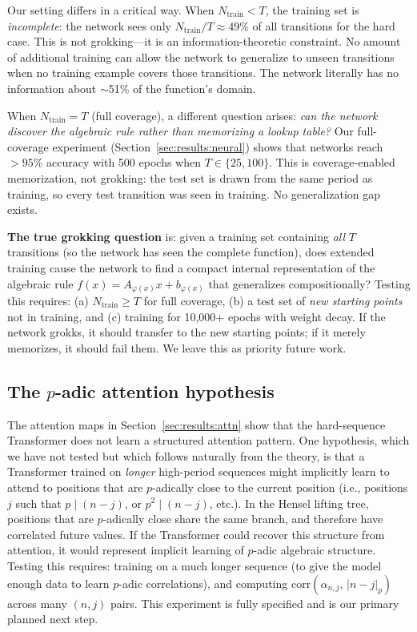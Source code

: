 \documentclass[11pt]{article}
\theoremstyle{plain}
\theoremstyle{definition}
\newcommand{\absp}[1]{\lvert #1 \rvert_p}
\begin{document}
Our setting differs in a critical way. When $N_{\mathrm{train}} < T$, the training set is \emph{incomplete}: the network sees only $N_{\mathrm{train}}/T \approx 49\%$ of all transitions for the hard case. This is not grokking---it is an information-theoretic constraint. No amount of additional training can allow the network to generalize to unseen transitions when no training example covers those transitions. The network literally has no information about $\sim$51\% of the function's domain.

When $N_{\mathrm{train}} = T$ (full coverage), a different question arises: \emph{can the network discover the algebraic rule rather than memorizing a lookup table?} Our full-coverage experiment (Section~\ref{sec:results:neural}) shows that networks reach $>95\%$ accuracy with 500 epochs when $T \in \{25, 100\}$. This is coverage-enabled memorization, not grokking: the test set is drawn from the same period as training, so every test transition was seen in training. No generalization gap exists.

\textbf{The true grokking question} is: given a training set containing \emph{all} $T$ transitions (so the network has seen the complete function), does extended training cause the network to find a compact internal representation of the algebraic rule $f(x) = A_{\varphi(x)}x + b_{\varphi(x)}$ that generalizes compositionally? Testing this requires: (a) $N_{\mathrm{train}} \geq T$ for full coverage, (b) a test set of \emph{new starting points} not in training, and (c) training for 10,000+ epochs with weight decay. If the network grokks, it should transfer to the new starting points; if it merely memorizes, it should fail them. We leave this as priority future work.

\subsection{The $p$-adic attention hypothesis}

The attention maps in Section~\ref{sec:results:attn} show that the hard-sequence Transformer does not learn a structured attention pattern. One hypothesis, which we have not tested but which follows naturally from the theory, is that a Transformer trained on \emph{longer} high-period sequences might implicitly learn to attend to positions that are $p$-adically close to the current position (i.e., positions $j$ such that $p \mid (n-j)$, or $p^2 \mid (n-j)$, etc.). In the Hensel lifting tree, positions that are $p$-adically close share the same branch, and therefore have correlated future values. If the Transformer could recover this structure from attention, it would represent implicit learning of $p$-adic algebraic structure. Testing this requires: training on a much longer sequence (to give the model enough data to learn $p$-adic correlations), and computing $\mathrm{corr}(\alpha_{n,j},\, \absp{n-j})$ across many $(n,j)$ pairs. This experiment is fully specified and is our primary planned next step.
\end{document}
